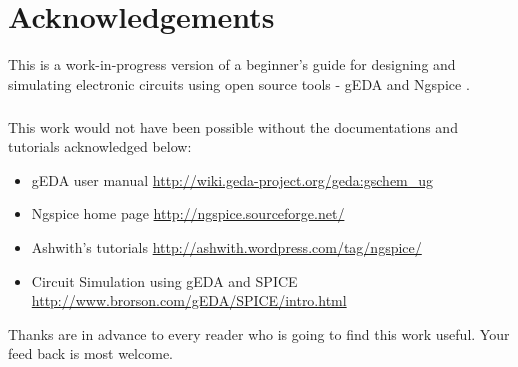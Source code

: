 \chapter*{Acknowledgements}

This is a work-in-progress version of a beginner's guide for designing and simulating electronic circuits using open source tools - gEDA and Ngspice .

\paragraph{}
	This work would not have been possible without the documentations and tutorials acknowledged below:

\begin{itemize}
\item
gEDA user manual \url{http://wiki.geda-project.org/geda:gschem_ug}
\item
Ngspice home page \url{http://ngspice.sourceforge.net/}
\item
Ashwith's tutorials \url{http://ashwith.wordpress.com/tag/ngspice/}
\item
Circuit Simulation using gEDA and SPICE   \url{http://www.brorson.com/gEDA/SPICE/intro.html}
\end{itemize}

Thanks are in advance to every reader who is going to find this work useful. Your feed back is most welcome.

